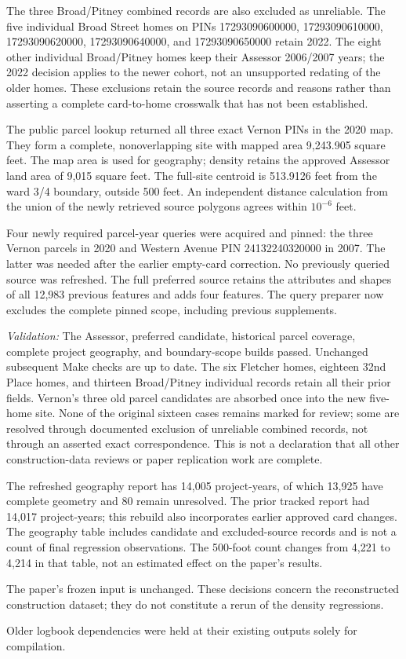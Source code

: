 The three Broad/Pitney combined records are also excluded as unreliable. The five
individual Broad Street homes on PINs 17293090600000, 17293090610000, 17293090620000,
17293090640000, and 17293090650000 retain 2022. The eight other individual
Broad/Pitney homes keep their Assessor 2006/2007 years; the 2022 decision applies
to the newer cohort, not an unsupported redating of the older homes. These
exclusions retain the source records and reasons rather than asserting a complete
card-to-home crosswalk that has not been established.

The public parcel lookup returned all three exact Vernon PINs in the 2020 map.
They form a complete, nonoverlapping site with mapped area 9,243.905 square feet.
The map area is used for geography; density retains the approved Assessor land
area of 9,015 square feet. The full-site centroid is 513.9126 feet from the
ward 3/4 boundary, outside 500 feet. An independent distance calculation from the
union of the newly retrieved source polygons agrees within $10^{-6}$ feet.

Four newly required parcel-year queries were acquired and pinned: the three
Vernon parcels in 2020 and Western Avenue PIN 24132240320000 in 2007. The latter
was needed after the earlier empty-card correction. No previously queried source
was refreshed. The full preferred source retains the attributes and shapes of all
12,983 previous features and adds four features. The query preparer now excludes
the complete pinned scope, including previous supplements.

\textit{Validation:} The Assessor, preferred candidate, historical parcel coverage,
complete project geography, and boundary-scope builds passed. Unchanged subsequent
Make checks are up to date. The six Fletcher homes, eighteen 32nd Place homes,
and thirteen Broad/Pitney individual records retain all their prior fields.
Vernon's three old parcel candidates are absorbed once into the new five-home
site. None of the original sixteen cases remains marked for review; some are
resolved through documented exclusion of unreliable combined records, not through
an asserted exact correspondence. This is not a declaration that all other
construction-data reviews or paper replication work are complete.

The refreshed geography report has 14,005 project-years, of which 13,925 have
complete geometry and 80 remain unresolved. The prior tracked report had 14,017
project-years; this rebuild also incorporates earlier approved card changes.
The geography table includes candidate and excluded-source records and is not a
count of final regression observations. The 500-foot count changes from 4,221
to 4,214 in that table, not an estimated effect on the paper's results.

The paper's frozen input is unchanged. These decisions concern the reconstructed
construction dataset; they do not constitute a rerun of the density regressions.

Older logbook dependencies were held at their existing outputs solely for compilation.
